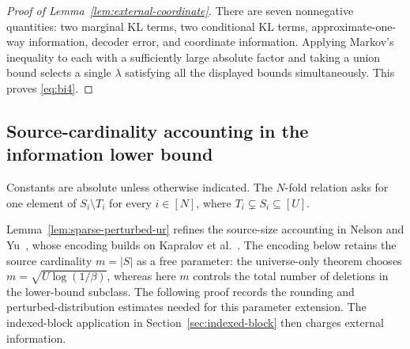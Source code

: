 \documentclass[11pt,letterpaper]{article}
\numberwithin{equation}{section}
\begin{document}
\begin{proof}[Proof of Lemma~\ref{lem:external-coordinate}]
There are seven nonnegative quantities: two marginal KL terms, two conditional KL terms, approximate-one-way information, decoder error, and coordinate information.
Applying Markov's inequality to each with a sufficiently large absolute factor and taking a union bound selects a single $\lambda$ satisfying all the displayed bounds simultaneously.
This proves \eqref{eq:bi4}.
\end{proof}


\subsection{Source-cardinality accounting in the information lower bound}
\label{sec:graph-frontier}

Constants are absolute unless otherwise indicated.
The $N$-fold relation asks for one element of $S_i\setminus T_i$ for every $i\in[N]$, where $T_i\subsetneq S_i\subseteq[U]$.

Lemma~\ref{lem:sparse-perturbed-ur} refines the source-size accounting in Nelson and Yu~\cite[Appendix~B]{NelsonYu2019}, whose encoding builds on Kapralov et al.~\cite[Section~3.1]{KNPWWY2017}.
The encoding below retains the source cardinality $m=|S|$ as a free parameter: the universe-only theorem chooses $m=\sqrt{U\log(1/\beta)}$, whereas here $m$ controls the total number of deletions in the lower-bound subclass.
The following proof records the rounding and perturbed-distribution estimates needed for this parameter extension.
The indexed-block application in Section~\ref{sec:indexed-block} then charges external information.
\end{document}
